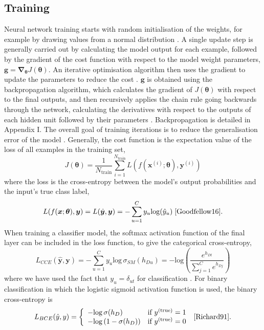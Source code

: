 \documentclass[12pt]{article}
\begin{document}
\subsection{Training}
Neural network training starts with random initialisation of the weights, for example by drawing values from a normal distribution \cite{Goodfellow16}. A single update step is generally carried out by calculating the model output for each example, followed by the gradient of the cost function with respect to the model weight parameters, $\bm{g}=\bm\nabla_{\bm\theta}J(\bm\theta)$. An iterative optimisation algorithm then uses the gradient to update the parameters to reduce the cost \cite{Goodfellow16}. $\bm{g}$ is obtained using the backpropagation algorithm, which calculates the gradient of $J(\bm\theta)$ with respect to the final outputs, and then recursively applies the chain rule going backwards through the network, calculating the derivatives with respect to the outputs of each hidden unit followed by their parameters \cite{Haykin98}. Backpropagation is detailed in Appendix I. The overall goal of training iterations is to reduce the generalisation error of the model \cite{Goodfellow16}. Generally, the cost function is the expectation value of the loss of all examples in the training set,
\begin{equation}
J(\boldsymbol\theta)=\frac{1}{N_{\mathrm{train}}}\sum_{i=1}^{N_{\mathrm{train}}}L(f(\bm{x}^{(i)};\boldsymbol\theta),\bm{y}^{(i)})
\end{equation}
where the loss is the cross-entropy between the model's output probabilities and the input's true class label,
\begin{equation}
L(f(\bm{x};\boldsymbol\theta),\bm{y})=L(\hat{\bm{y}},\bm{y})=-\sum_{u=1}^Cy_u\mathrm{log}(\hat{y}_u)\; \cite{Goodfellow16}.
\end{equation}
When training a classifier model, the softmax activation function of the final layer can be included in the loss function, to give the categorical cross-entropy,
\begin{equation}
L_{CCE}(\hat{\bm{y}},\bm{y})=-\sum_{u=1}^Cy_u\mathrm{log}\,\sigma_{SM}(h_{Du})=-\mathrm{log}\left(\frac{e^{h_{Dt}}}{\sum_{j=1}^{C}e^{h_{Dj}}}\right)
\end{equation}
where we have used the fact that $y_u=\delta_{ut}$ for classification \cite{Kline05}. For binary classification in which the logistic sigmoid activation function is used, the binary cross-entropy is
\begin{equation}
L_{BCE}(\hat{y},y)=
\left\{
\begin{array}{ll}
-\mathrm{log}\,\sigma(h_D) & \mbox{if } y^{(\mathrm{true})}=1 \\
-\mathrm{log}\left(1-\sigma(h_D)\right) & \mbox{if } y^{(\mathrm{true})}=0
\end{array}
\right.\;\cite{Richard91}.
\end{equation}
\end{document}
